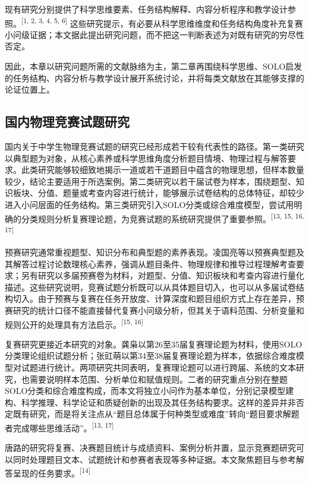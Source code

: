 \documentclass[
  12pt,
  a4paper,twoside,openany]{ctexbook}
\begin{document}
现有研究分别提供了科学思维要素、任务结构解释、内容分析程序和教学设计参照。\textsuperscript{[1, 2, 3, 4, 5, 6]}
这些研究提示，有必要从科学思维维度和任务结构角度补充复赛小问级证据；本文据此提出研究问题，而不把这一判断表述为对既有研究的穷尽性否定。

因此，本章以研究问题所需的文献脉络为主，第二章再围绕科学思维、SOLO启发的任务结构、内容分析与教学设计展开系统讨论，并将每类文献放在其能够支撑的论证位置上。

\subsection{国内物理竞赛试题研究}\label{ux56fdux5185ux7269ux7406ux7adeux8d5bux8bd5ux9898ux7814ux7a76}

国内关于中学生物理竞赛试题的研究已经形成若干较有代表性的路径。第一类研究以典型题为对象，从核心素养或科学思维角度分析题目情境、物理过程与解答要求。此类研究能够较细致地揭示一道或若干道题目中蕴含的物理思想，但样本数量较少，结论主要适用于所选案例。第二类研究以若干届试卷为样本，围绕题型、知识板块、分值、题量或考查内容进行统计，能够展示试卷结构的总体特征，却较少进入小问层面的任务结构。第三类研究引入SOLO分类或综合难度模型，尝试用明确的分类规则分析复赛理论题，为竞赛试题的系统研究提供了重要参照。\textsuperscript{[13, 15, 16, 17]}

预赛研究通常重视题型、知识分布和典型题的素养表现。凌国亮等以预赛典型题及其解答过程讨论数理核心素养，强调从题目条件、物理规律和推导过程理解考查要求；另有研究以多届预赛卷为材料，对题型、分值、知识板块和考查内容进行量化描述。这些研究说明，竞赛试题分析既可以从具体题目切入，也可以从多届试卷结构切入。由于预赛与复赛在任务开放度、计算深度和题目组织方式上存在差异，预赛研究的统计口径不能直接替代复赛小问级分析，但其关于语料范围、分析变量和规则公开的处理具有方法启示。\textsuperscript{[15, 16]}

复赛研究更接近本研究的对象。龚枭以第26至35届复赛理论题为材料，使用SOLO分类理论组织试题分析；张豇萌以第34至38届复赛理论题为样本，依据综合难度模型对试题进行统计。两项研究共同表明，复赛理论题可以进行跨届、系统的文本研究，也需要说明样本范围、分析单位和赋值规则。二者的研究重点分别在整题SOLO分类和综合难度构成，而本文将独立小问作为基本单位，分别记录模型建构、科学推理、科学论证和质疑创新的出现及其任务结构要求。这样的差异并非否定既有研究，而是将关注点从``题目总体属于何种类型或难度''转向``题目要求解题者完成哪些思维活动''。\textsuperscript{[13, 17]}

唐路的研究将复赛、决赛题目统计与成绩资料、案例分析并置，显示竞赛题研究可以同时处理题目文本、试题统计和参赛者表现等多种证据。本文聚焦题目与参考解答呈现的任务要求。\textsuperscript{[14]}
\end{document}
